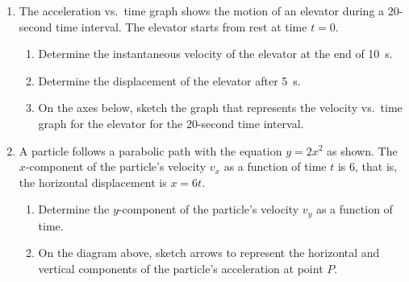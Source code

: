 \documentclass{../../oss-apphys}
\begin{document}
\begin{enumerate}[leftmargin=15pt]
\item The acceleration vs.\ time graph shows the motion of an elevator during a
  $20$-second time interval. The elevator starts from rest at time $t=0$. 
  \begin{center}
  \end{center}
  \begin{enumerate}[noitemsep]
  \item Determine the instantaneous velocity of the elevator at the end of
    \SI{10}{s}.
    \vspace{1.5in}
  \item Determine the displacement of the elevator after \SI{5}{s}.
    \vspace{1.5in}
  \item On the axes below, sketch the graph that represents the velocity vs.\
    time graph for the elevator for the $20$-second time interval.
    \begin{center}
    \end{center}
    \newpage
  \end{enumerate}
  
\item A particle follows a parabolic path with the equation $y=2x^2$ as shown.
  The $x$-component of the particle's velocity $v_x$ as a function of time $t$
  is $6$, that is, the horizontal displacement is $x=6t$.
  \begin{center}
  \end{center}
  \begin{enumerate}[noitemsep]
  \item Determine the $y$-component of the particle's velocity $v_y$ as a
    function of time.
  \item On the diagram above, sketch arrows to represent the horizontal and
    vertical components of the particle's acceleration at point $P$.
  \end{enumerate}
  \vspace{1in}
  

\end{enumerate}
\end{document}
